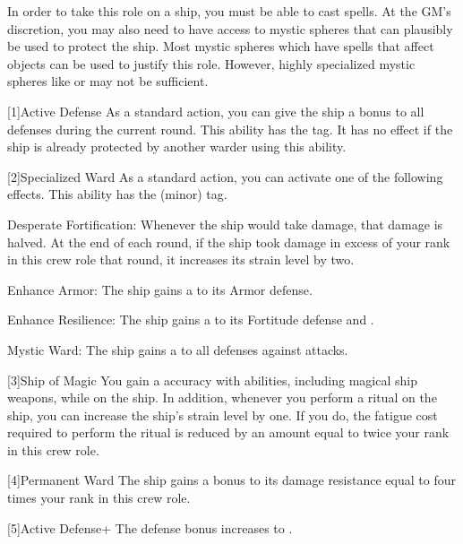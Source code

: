        In order to take this role on a ship, you must be able to cast spells.
        At the GM's discretion, you may also need to have access to mystic spheres that can plausibly be used to protect the ship.
        Most mystic spheres which have spells that affect objects can be used to justify this role.
        However, highly specialized mystic spheres like  or  may not be sufficient.

        [1]{Active Defense} As a standard action, you can give the ship a  bonus to all defenses during the current round.
        This ability has the  tag.
        It has no effect if the ship is already protected by another warder using this ability.

        [2]{Specialized Ward} As a standard action, you can activate one of the following effects.
        This ability has the  (minor) tag.
        \begin{raggeditemize}
            \item Desperate Fortification: Whenever the ship would take damage, that damage is halved.
                At the end of each round, if the ship took damage in excess of your rank in this crew role that round, it increases its strain level by two.
            \item Enhance Armor: The ship gains a   to its Armor defense.
            \item Enhance Resilience: The ship gains a   to its Fortitude defense and .
            \item Mystic Ward: The ship gains a   to all defenses against \magical attacks.
        \end{raggeditemize}

        [3]{Ship of Magic} You gain a  accuracy with \magical abilities, including magical ship weapons, while on the ship.
        In addition, whenever you perform a ritual on the ship, you can increase the ship's strain level by one.
        If you do, the fatigue cost required to perform the ritual is reduced by an amount equal to twice your rank in this crew role.

        [4]{Permanent Ward} The ship gains a bonus to its damage resistance equal to four times your rank in this crew role.

        [5]{Active Defense+} The defense bonus increases to .

